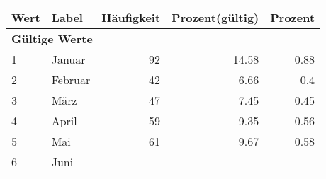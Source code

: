      \begin{longtable}{lXrrr}
     \toprule
     \textbf{Wert} & \textbf{Label} & \textbf{Häufigkeit} & \textbf{Prozent(gültig)} & \textbf{Prozent} \\
     \endhead
     \midrule
     \multicolumn{5}{l}{\textbf{Gültige Werte}}\\

     1 &
     \multicolumn{1}{X}{ Januar   } &


       \num{92} &
       \num[round-mode=places,round-precision=2]{14,58} &
         \num[round-mode=places,round-precision=2]{0,88} \\

     2 &
     \multicolumn{1}{X}{ Februar   } &


       \num{42} &
       \num[round-mode=places,round-precision=2]{6,66} &
         \num[round-mode=places,round-precision=2]{0,4} \\

     3 &
     \multicolumn{1}{X}{ März   } &


       \num{47} &
       \num[round-mode=places,round-precision=2]{7,45} &
         \num[round-mode=places,round-precision=2]{0,45} \\

     4 &
     \multicolumn{1}{X}{ April   } &


       \num{59} &
       \num[round-mode=places,round-precision=2]{9,35} &
         \num[round-mode=places,round-precision=2]{0,56} \\

     5 &
     \multicolumn{1}{X}{ Mai   } &


       \num{61} &
       \num[round-mode=places,round-precision=2]{9,67} &
         \num[round-mode=places,round-precision=2]{0,58} \\

     6 &
     \multicolumn{1}{X}{ Juni   } &



\end{longtable}
